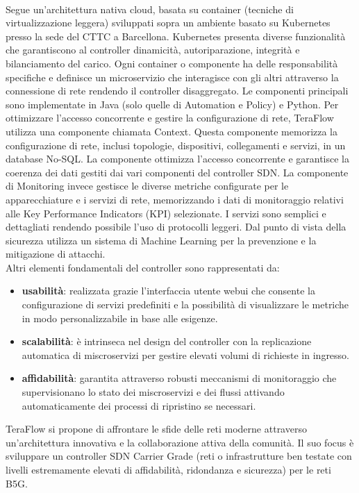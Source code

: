 \\Segue un'architettura nativa cloud, basata su container (tecniche di virtualizzazione leggera) sviluppati sopra un ambiente basato su Kubernetes presso la sede del CTTC a Barcellona. Kubernetes presenta
diverse funzionalità che garantiscono al controller dinamicità, autoriparazione, integrità e bilanciamento del carico.
Ogni container o componente ha delle responsabilità specifiche e definisce un microservizio che interagisce con gli altri attraverso la connessione di rete rendendo il controller disaggregato.
Le componenti principali sono implementate in Java (solo quelle di Automation e Policy) e Python.
Per ottimizzare l'accesso concorrente e gestire la configurazione di rete, TeraFlow utilizza una componente chiamata Context. Questa componente memorizza la configurazione di rete, inclusi topologie, dispositivi, 
collegamenti e servizi, in un database No-SQL. La componente ottimizza l'accesso concorrente e garantisce la coerenza dei dati gestiti dai vari componenti del controller SDN.
La componente di Monitoring invece gestisce le diverse metriche configurate per le apparecchiature e i servizi di rete, memorizzando i dati di monitoraggio relativi alle Key Performance Indicators (KPI) selezionate.
I servizi sono semplici e dettagliati rendendo possibile l'uso di protocolli leggeri.
Dal punto di vista della sicurezza utilizza un sistema di Machine Learning per la prevenzione e la mitigazione di attacchi.
\\Altri elementi fondamentali del controller sono rappresentati da:
\begin{itemize} 
    \item \textbf{usabilità}: realizzata grazie l'interfaccia utente webui che consente la configurazione di servizi predefiniti e la possibilità di visualizzare le metriche in modo personalizzabile in base alle esigenze.
    \item \textbf{scalabilità}: è intrinseca nel design del controller con la replicazione automatica di miscroservizi per gestire elevati volumi di richieste in ingresso.
    \item \textbf{affidabilità}: garantita attraverso robusti meccanismi di monitoraggio che supervisionano lo stato dei miscroservizi e dei flussi attivando automaticamente dei processi di ripristino se necessari.
\end{itemize}
TeraFlow si propone di affrontare le sfide delle reti moderne attraverso un'architettura innovativa e la collaborazione attiva della comunità. 
Il suo focus è sviluppare un controller SDN Carrier Grade (reti o infrastrutture ben testate con livelli estremamente elevati di affidabilità, ridondanza e sicurezza) per le reti B5G.


